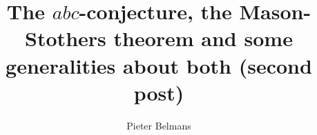 \documentclass[11pt, a4paper, openany, oneside, article]{memoir}
\begin{document}
\title{The $abc$-conjecture, the Mason-Stothers theorem and some generalities about both (second post)}
\author{Pieter Belmans}
\maketitle


\end{document}
